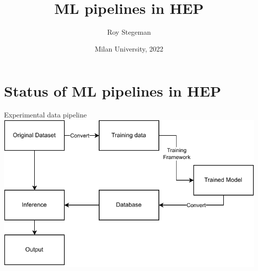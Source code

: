 \documentclass[aspectratio=169,9pt]{beamer}
\title{ML pipelines in HEP}
\date{Milan University, 2022}
\author{Roy Stegeman}
\institute{University of Milan and INFN Milan}
\begin{document}
{
\begin{frame}
  \titlepage
\end{frame}
}


\section{Status of ML pipelines in HEP}
\begin{frame}[t]{Experimental data pipeline}
  \centering
  \includegraphics[width=.7\textwidth]{MLworkflow.drawio.pdf}
\end{frame}
\end{document}

